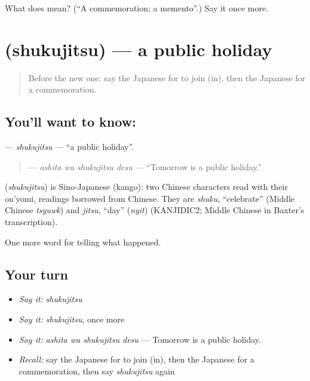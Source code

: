 \begin{tcolorbox}[breakable,colback=teal!4,colframe=teal!35!black,title={Before you move on}]
What does  mean? (\textquotedblleft{}A commemoration; a memento\textquotedblright{}.) Say it once more.
\end{tcolorbox}
\section[\texorpdfstring{\ja{しゅくじつ} (shukujitsu)}{しゅくじつ (shukujitsu)}]{ (shukujitsu) — a public holiday}

\label{lesson:JA-C285-shukujitsu}



\begin{quote}
Before the new one: say the Japanese for to join (in), then the Japanese for a commemoration.
\end{quote}

\subsection*{You'll want to know: }
\textbf{} — \emph{shukujitsu} — \textquotedblleft{}a public holiday\textquotedblright{}.

\begin{quote}
\textbf{ } — \emph{ashita wa shukujitsu desu} — \textquotedblleft{}Tomorrow is a public holiday.\textquotedblright{}
\end{quote}

\begin{cousinweb}
\textbf{} (\emph{shukujitsu}) is Sino-Japanese (kango): two Chinese characters read with their on'yomi, readings borrowed from Chinese. They are \emph{shuku}, \textquotedblleft{}celebrate\textquotedblright{} (Middle Chinese \emph{tsyuwk}) and \emph{jitsu}, \textquotedblleft{}day\textquotedblright{} (\emph{nyit}) (KANJIDIC2; Middle Chinese in Baxter's transcription).
\end{cousinweb}

\begin{grammarlens}[title={What you've built}]
One more word for telling what happened.
\end{grammarlens}

\subsection*{Your turn}
\begin{itemize}
\raggedright
  \item \emph{Say it:} \emph{shukujitsu}
  \item \emph{Say it:} \emph{shukujitsu}, once more
  \item \emph{Say it:} \emph{ashita wa shukujitsu desu} — Tomorrow is a public holiday.
  \item \emph{Recall:} say the Japanese for to join (in), then the Japanese for a commemoration, then say \emph{shukujitsu} again
\end{itemize}

